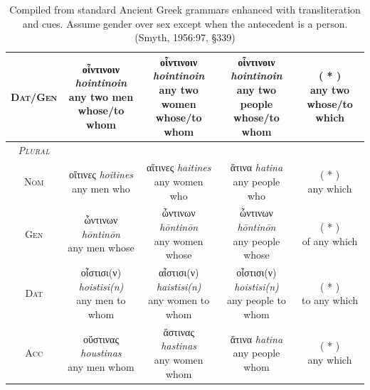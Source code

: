 \documentclass[10pt,a4paper,notitlepage]{article}
\newcommand{\tsc}[1]{\textsc{#1}}
\newcommand*{\grc}[1]{\fontspec{Inter}#1\rmfamily}
\newcommand{\trc}[1]{\textit{\fontspec{Tinos}#1}}
\begin{document}
\begin{table}[H]
\begin{tabular}{c|ccc|c}
            \tsc{Dat/Gen} & \makecell{\grc{οἷντινοιν} \trc{hointinoin} \\ \small any two men \\ \small whose/to whom} & \makecell{\grc{οἷντινοιν} \trc{hointinoin} \\ \small any two women \\ \small whose/to whom} & \makecell{\grc{οἷντινοιν} \trc{hointinoin} \\ \small any two people \\ \small whose/to whom} & \makecell{( * ) \\ \small any two \\ \small whose/to which} \\
            \hline
            \emph{\tsc{Plural}} & & & & \\
            \tsc{Nom} & \makecell{\grc{οἵτινες} \trc{hoitines} \\ \small any men who} & \makecell{\grc{αἵτινες} \trc{haitines} \\ \small any women who} & \makecell{\grc{ἅτινα} \trc{hatina} \\ \small any people who} & \makecell{( * ) \\ \small any which} \\
            \tsc{Gen} & \makecell{\grc{ὧντινων} \trc{hōntinōn} \\ \small any men whose} & \makecell{\grc{ὧντινων} \trc{hōntinōn} \\ \small any women whose} & \makecell{\grc{ὧντινων} \trc{hōntinōn} \\ \small any people whose} & \makecell{( * ) \\ \small of any which} \\
            \tsc{Dat} & \makecell{\grc{οἷστισι(ν)} \trc{hoistisi(n)} \\ \small any men to whom} & \makecell{\grc{αἷστισι(ν)} \trc{haistisi(n)}\\ \small any women to whom} & \makecell{\grc{οἷστισι(ν)} \trc{hoistisi(n)} \\ \small any people to whom} & \makecell{( * ) \\ \small to any which} \\
            \tsc{Acc} & \makecell{\grc{οὕστινας} \trc{houstinas} \\ \small any men whom} & \makecell{\grc{ἅστινας} \trc{hastinas} \\ \small any women whom} & \makecell{\grc{ἅτινα} \trc{hatina} \\ \small any people whom} & \makecell{( * ) \\ \small any which} \\
        \end{tabular}
        \caption{Compiled from standard Ancient Greek grammars enhanced with transliteration and cues.
            Assume gender over sex except when the antecedent is a person.
            (Smyth, 1956:97, \S339)}
    \end{table}
\end{document}
